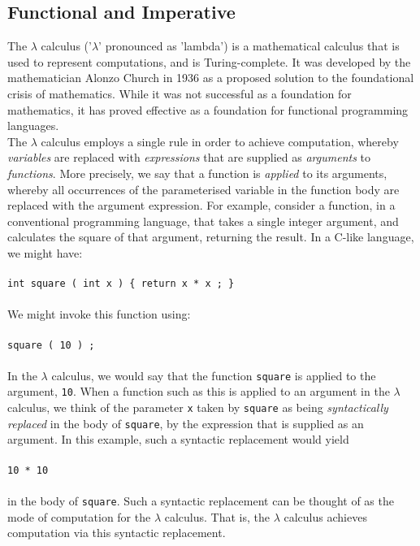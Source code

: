 \documentclass{article}
\begin{document}
\subsection{Functional and Imperative}
The $\lambda$ calculus ('$\lambda$' pronounced as 'lambda') is a mathematical calculus that is used to represent computations, and is Turing-complete. It was developed by the mathematician Alonzo Church in 1936 as a proposed solution to the foundational crisis of mathematics. While it was not successful as a foundation for mathematics, it has proved effective as a foundation for functional programming languages.
\\
\indent The $\lambda$ calculus employs a single rule in order to achieve computation, whereby \emph{variables} are replaced with \emph{expressions} that are supplied as \emph{arguments} to \emph{functions}. More precisely, we say that a function is \emph{applied} to its arguments, whereby all occurrences of the parameterised variable in the function body are replaced with the argument expression. For example, consider a function, in a conventional programming language, that takes a single integer argument, and calculates the square of that argument, returning the result. In a C-like language, we might have:
\\\\
\indent \texttt{int square ( int x ) \{ return x * x ; \}}
\\\\
We might invoke this function using:
\\\\
\indent \texttt{square ( 10 ) ;}
\\\\
In the $\lambda$ calculus, we would say that the function \texttt{square} is applied to the argument, \texttt{10}. When a function such as this is applied to an argument in the $\lambda$ calculus, we think of the parameter \texttt{x} taken by \texttt{square} as being \emph{syntactically replaced} in the body of \texttt{square}, by the expression that is supplied as an argument. In this example, such a syntactic replacement would yield
\\\\
\indent \texttt{10 * 10}
\\\\
in the body of \texttt{square}. Such a syntactic replacement can be thought of as the mode of computation for the $\lambda$ calculus. That is, the $\lambda$ calculus achieves computation via this syntactic replacement.
\\
\end{document}
